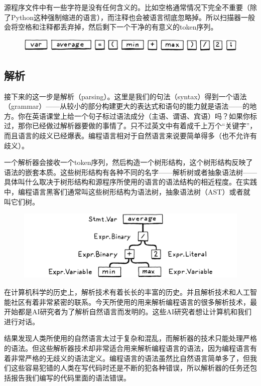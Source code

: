 \documentclass[cn,10pt,math=newtx,citestyle=gb7714-2015,bibstyle=gb7714-2015]{elegantbook}
\begin{document}
源程序文件中有一些字符是没有任何含义的。比如空格通常情况下完全不重要（除了Python这种强制缩进的语言），而注释也会被语言彻底忽略掉。所以扫描器一般会将空格和注释都丢弃掉，然后剩下一个干净的有意义的token序列。

\begin{figure}[h]
\centering
\includegraphics[width=\textwidth]{./image/a-map-of-the-territory/tokens.png}
\end{figure}

\subsection{解析}

接下来的这一步是解析（parsing）。这里是我们的句法（syntax）得到一个语法（grammar）——从较小的部分构建更大的表达式和语句的能力就是语法——的地方。你在英语课堂上给一个句子标过语法成分（主语、谓语、宾语）吗？如果你标过，那你已经做过解析器要做的事情了。只不过英文中有着成千上万个“关键字”，而且语言的歧义已经爆表。编程语言相对于自然语言来说要简单得多（也不允许有歧义）。

一个解析器会接收一个token序列，然后构造一个树形结构，这个树形结构反映了语法的嵌套本质。这些树形结构有各种不同的名字——解析树或者抽象语法树——具体叫什么取决于树形结构和源程序所使用的语言的语法结构的相近程度。在实践中，编程语言黑客们通常叫这些树形结构为语法树，抽象语法树（AST）或者就叫它们树。

\begin{figure}[h]
\centering
\includegraphics[width=\textwidth]{./image/a-map-of-the-territory/ast.png}
\end{figure}

在计算机科学的历史上，解析技术有着长长的丰富的历史。并且解析技术和人工智能社区有着非常紧密的联系。今天所使用的用来解析编程语言的很多解析技术，最开始都是AI研究者为了解析自然语言而发明的。这些AI研究者想让计算机和我们进行对话。

结果发现人类所使用的自然语言太过于复杂和混乱，而解析器的技术只能处理严格的语法。但这些解析器技术却非常适合用来解析编程语言的语法，因为编程语言有着非常严格的无歧义的语法定义。编程语言的语法虽然比自然语言简单多了，但我们这些容易犯错的人类在写代码时还是不断的犯各种错误，所以解析器的任务还包括报告我们编写的代码里面的语法错误。
\end{document}

